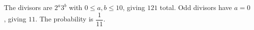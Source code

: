 The divisors are $2^a3^b$ with $0\le a,b\le10$, giving $121$ total. Odd divisors have $a=0$, giving $11$. The probability is $\boxed{\dfrac{1}{11}}$.
